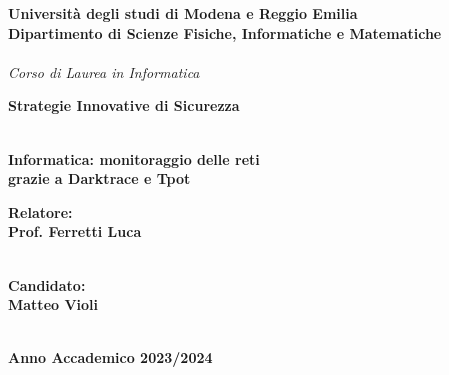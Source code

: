 \documentclass[12pt,a4paper,oneside,onecolumn,openright]{book}
\begin{document}
\begin{titlepage}
\begin{center}
{
    \large
    \textbf{Università  degli studi di Modena e Reggio Emilia} \\
   	\textbf{Dipartimento di Scienze Fisiche, Informatiche e Matematiche} \\
    \hspace*{0cm} \hrulefill \hspace*{0cm} \\
   	\emph{Corso di Laurea in Informatica}
    
  
  
 		\huge{\bf Strategie Innovative di Sicurezza}}\\
		\vspace{3mm}
		{\huge{\bf Informatica: monitoraggio delle reti}}\\
		\vspace{3mm}
		\vspace{3mm}
		{\huge{\bf  grazie a Darktrace e Tpot}}\\
		\vspace{3mm}
		\vspace{3mm}
		
		\end{center}
		
\vspace{40mm}
\par
\noindent
\begin{minipage}[t]{0.47\textwidth}
{\large{\bf Relatore:\\
Prof.
Ferretti Luca}}\\ 
\\
\end{minipage}
\hfill
\begin{minipage}[t]{0.47\textwidth}\raggedleft
{\large{\bf Candidato:\\
Matteo Violi}}
\end{minipage}
\vspace{20mm}
\begin{center}
\hspace*{0cm} \hrulefill \hspace*{0cm} \\
{\large{\bf 
Anno Accademico 2023/2024}}
\end{center}

\end{titlepage}
\end{document}
